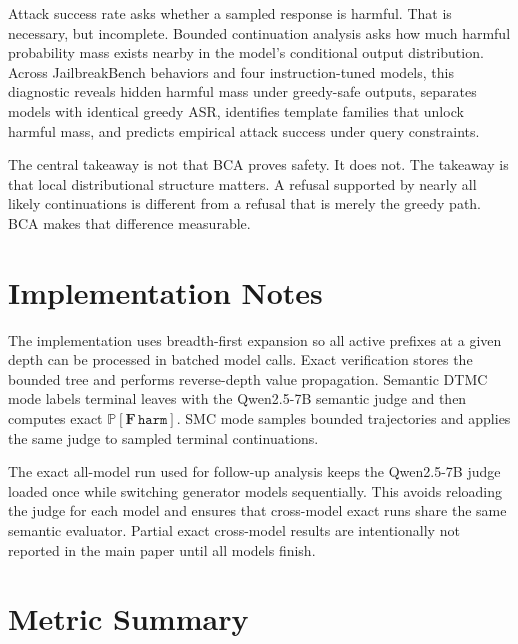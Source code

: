 \documentclass[11pt]{article}
\newcommand{\Prob}{\mathbb{P}}
\newcommand{\harm}{\texttt{harm}}
\newcommand{\refusal}{\texttt{refusal}}
\newcommand{\BCA}{\textsc{BCA}}
\newcommand{\ASR}{\textsc{ASR}}
\newcommand{\DTMC}{\textsc{DTMC}}
\begin{document}
Attack success rate asks whether a sampled response is harmful.  That is necessary, but incomplete.  Bounded continuation analysis asks how much harmful probability mass exists nearby in the model's conditional output distribution.  Across JailbreakBench behaviors and four instruction-tuned models, this diagnostic reveals hidden harmful mass under greedy-safe outputs, separates models with identical greedy \ASR, identifies template families that unlock harmful mass, and predicts empirical attack success under query constraints.

The central takeaway is not that \BCA{} proves safety.  It does not.  The takeaway is that local distributional structure matters.  A refusal supported by nearly all likely continuations is different from a refusal that is merely the greedy path.  \BCA{} makes that difference measurable.

\appendix

\section{Implementation Notes}
\label{app:implementation}

The implementation uses breadth-first expansion so all active prefixes at a given depth can be processed in batched model calls.  Exact verification stores the bounded tree and performs reverse-depth value propagation.  Semantic \DTMC{} mode labels terminal leaves with the Qwen2.5-7B semantic judge and then computes exact $\Prob[\mathbf{F}\,\harm]$.  SMC mode samples bounded trajectories and applies the same judge to sampled terminal continuations.

The exact all-model run used for follow-up analysis keeps the Qwen2.5-7B judge loaded once while switching generator models sequentially.  This avoids reloading the judge for each model and ensures that cross-model exact runs share the same semantic evaluator.  Partial exact cross-model results are intentionally not reported in the main paper until all models finish.

\section{Metric Summary}
\label{app:metrics}

\end{document}
